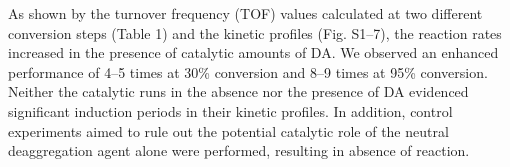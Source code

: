 \documentclass[journal=jacsat,manuscript=article]{achemso}
\begin{document}
	
	As shown by the turnover frequency (TOF) values calculated at two different conversion steps (Table 1) and the kinetic profiles (Fig. S1–7), the reaction rates increased in the presence of catalytic amounts of DA. We observed an enhanced performance	of 4–5 times at 30\% conversion and 8–9 times at 95\% conversion. Neither the catalytic runs in the absence nor the	presence of DA evidenced significant induction periods in their kinetic profiles. In addition, control experiments aimed
	to rule out the potential catalytic role of the neutral deaggregation agent alone were performed, resulting in absence of
	reaction.
	
	
\end{document}
